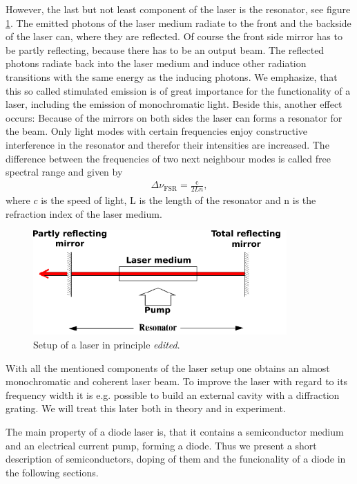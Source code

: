 However, the last but not least component of the laser is the resonator, see figure \ref{fig:lasersetup}.
The emitted photons of the laser medium radiate to the front and the backside of the laser can, where they are reflected. Of course the
front side mirror has to be partly reflecting, because there has to be an output beam. The reflected photons radiate back into the
laser medium and induce other radiation transitions with the same energy as the inducing photons. We emphasize, that this so called stimulated emission
is of great importance for the functionality of a laser, including the emission of monochromatic light. Beside this, another effect occurs:
Because of the mirrors on both sides the laser can forms a resonator for the beam. Only light modes with certain frequencies enjoy constructive interference
in the resonator and therefor their intensities are increased. The difference between the frequencies of two next neighbour modes is
called free spectral range and given by
\begin{align}
  \Delta \nu_\text{FSR} = \frac{\text{c}}{2 L n},
  \label{eqn:freespectralrange}
\end{align}
where $c$ is the speed of light, L is the length of the resonator and n is the refraction index of the laser medium.

\begin{figure}
  \centering
  \includegraphics[height = 4.0cm]{Ordnername/lasersetup_edit.pdf}
  \caption{Setup of a laser in principle \cite{manual2} \textit{edited}.}
  \label{fig:lasersetup}
\end{figure}

With all the mentioned components of the laser setup one obtains an almost monochromatic and coherent laser beam.
To improve the laser with regard to its frequency width it is e.g. possible to build an external cavity with a diffraction
grating. We will treat this later both in theory and in experiment.

The main property of a diode laser is, that it contains a semiconductor medium and an electrical current pump, forming a diode.
Thus we present a short description of semiconductors, doping of them and the funcionality of a diode in the following sections.

